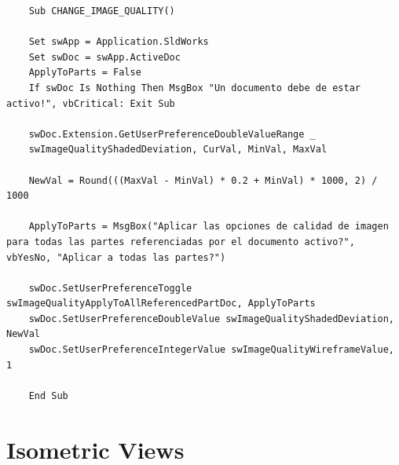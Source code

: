 \documentclass[12pt,letterpaper,final]{report}
\begin{document}
\begin{lstlisting}
	Sub CHANGE_IMAGE_QUALITY()
	
	Set swApp = Application.SldWorks
	Set swDoc = swApp.ActiveDoc
	ApplyToParts = False
	If swDoc Is Nothing Then MsgBox "Un documento debe de estar activo!", vbCritical: Exit Sub
	
	swDoc.Extension.GetUserPreferenceDoubleValueRange _
	swImageQualityShadedDeviation, CurVal, MinVal, MaxVal
	
	NewVal = Round(((MaxVal - MinVal) * 0.2 + MinVal) * 1000, 2) / 1000
	
	ApplyToParts = MsgBox("Aplicar las opciones de calidad de imagen para todas las partes referenciadas por el documento activo?", vbYesNo, "Aplicar a todas las partes?")
	
	swDoc.SetUserPreferenceToggle swImageQualityApplyToAllReferencedPartDoc, ApplyToParts
	swDoc.SetUserPreferenceDoubleValue swImageQualityShadedDeviation, NewVal
	swDoc.SetUserPreferenceIntegerValue swImageQualityWireframeValue, 1
	
	End Sub
\end{lstlisting}

\chapter{Isometric Views}
\end{document}
